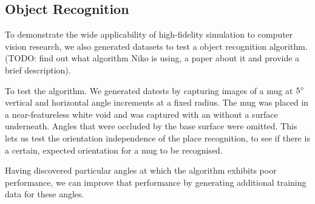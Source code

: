 \subsection{Object Recognition}


To demonstrate the wide applicability of high-fidelity simulation to computer vision research, we also generated datasets to test a object recognition algorithm. (TODO: find out what algorithm Niko is using, a paper about it and provide a brief description).

To test the algorithm. We generated datests by capturing images of a mug at $5\degree$ vertical and horizontal angle increments at a fixed radius. The mug was placed in a near-featureless white void and was captured with an without a surface underneath. Angles that were occluded by the base surface were omitted. This lets us test the orientation independence of the place recognition, to see if there is a certain, expected orientation for a mug to be recognised.


Having discovered particular angles at which the algorithm exhibits poor performance, we can improve that performance by generating additional training data for these angles.